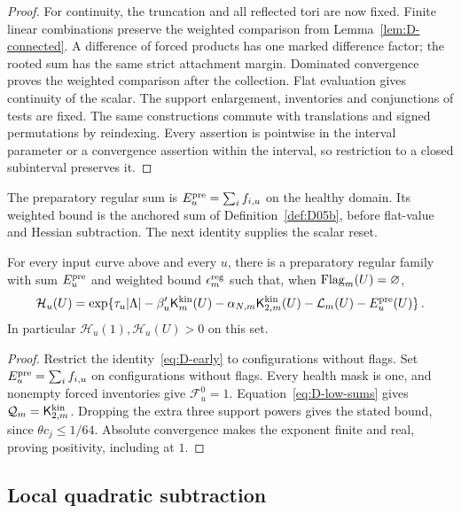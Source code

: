 \begin{proof}
For continuity, the truncation and all reflected tori are now fixed. Finite linear combinations preserve the weighted comparison from Lemma~\ref{lem:D-connected}. A difference of forced products has one marked difference factor; the rooted sum has the same strict attachment margin. Dominated convergence proves the weighted comparison after the collection. Flat evaluation gives continuity of the scalar. The support enlargement, inventories and conjunctions of tests are fixed. The same constructions commute with translations and signed permutations by reindexing. Every assertion is pointwise in the interval parameter or a convergence assertion within the interval, so restriction to a closed subinterval preserves it.
\end{proof}


The preparatory regular sum is $E_u^{\rm pre}=\sum_i f_{i,u}$ on the healthy domain. Its weighted bound is the anchored sum of Definition~\ref{def:D05b}, before flat-value and Hessian subtraction. The next identity supplies the scalar reset.

\begin{lemma}\label{lem:D4}
For every input curve above and every $u$, there is a preparatory regular family with sum $E_u^{\rm pre}$ and weighted bound $\epsilon_m^{\rm reg}$ such that, when $\operatorname{Flag}_m(U)=\varnothing$,
\begin{equation*}
\mathcal H_u(U)=\exp\{\tau_u|\Lambda|-\beta'_u\mathsf K_m^{\rm kin}(U)
-\alpha_{N,m}\mathsf K_{2,m}^{\rm kin}(U)-\mathcal L_m(U)-E_u^{\rm pre}(U)\}\,.
\end{equation*}
In particular $\mathcal H_u(1),\mathcal H_u(U)>0$ on this set.
\end{lemma}

\begin{proof}
Restrict the identity~\eqref{eq:D-early} to configurations without flags. Set $E_u^{\rm pre}=\sum_i f_{i,u}$ on configurations without flags. Every health mask is one, and nonempty forced inventories give $\mathcal F_u^0=1$. Equation~\eqref{eq:D-low-sums} gives $\mathcal Q_m=\mathsf K_{2,m}^{\rm kin}$. Dropping the extra three support powers gives the stated bound, since $\theta c_j\le1/64$. Absolute convergence makes the exponent finite and real, proving positivity, including at $1$. 
\end{proof}

\subsection{Local quadratic subtraction}\label{subsec:D-subtraction}

